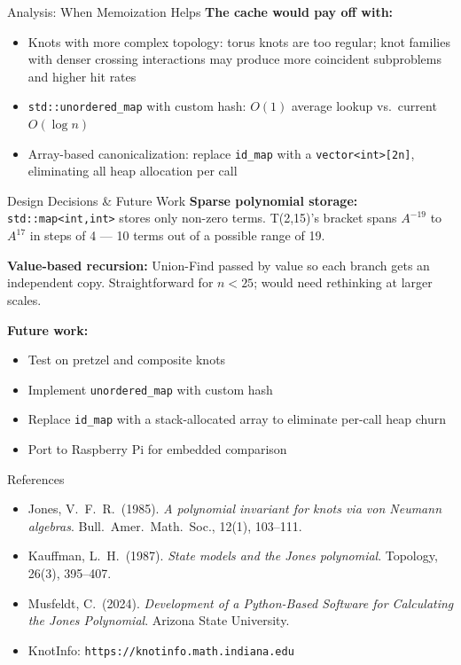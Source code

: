 \documentclass[final]{beamer}
\newlength{\colwidth}
\begin{document}
\begin{frame}[t,fragile]
\begin{columns}[t]
\begin{column}{\colwidth}
\begin{block}{Analysis: When Memoization Helps}
    \vspace{0.1cm}
    \textbf{The cache would pay off with:}
    \begin{itemize}\setlength\itemsep{0pt}
      \item Knots with more complex topology: torus knots are too regular; knot families with denser crossing interactions may produce more coincident subproblems and higher hit rates
      \item \texttt{std::unordered\_map} with custom hash: $O(1)$ average lookup vs.\ current $O(\log n)$
      \item Array-based canonicalization: replace \texttt{id\_map} with a \texttt{vector<int>[2n]}, eliminating all heap allocation per call
    \end{itemize}
  \end{block}

  \begin{block}{Design Decisions \& Future Work}
    \textbf{Sparse polynomial storage:} \texttt{std::map<int,int>} stores only non-zero terms. T(2,15)'s bracket spans $A^{-19}$ to $A^{17}$ in steps of 4 --- 10 terms out of a possible range of 19.

    \vspace{0.1cm}
    \textbf{Value-based recursion:} Union-Find passed by value so each branch gets an independent copy. Straightforward for $n < 25$; would need rethinking at larger scales.

    \vspace{0.1cm}
    \textbf{Future work:}
    \begin{itemize}\setlength\itemsep{0pt}
      \item Test on pretzel and composite knots
      \item Implement \texttt{unordered\_map} with custom hash
      \item Replace \texttt{id\_map} with a stack-allocated array to eliminate per-call heap churn
      \item Port to Raspberry Pi for embedded comparison
    \end{itemize}
  \end{block}

  \begin{block}{References}
    \footnotesize
    \begin{itemize}\setlength\itemsep{0pt}
      \item Jones, V.\ F.\ R.\ (1985). \textit{A polynomial invariant for knots via von Neumann algebras}. Bull.\ Amer.\ Math.\ Soc., 12(1), 103--111.
      \item Kauffman, L.\ H.\ (1987). \textit{State models and the Jones polynomial}. Topology, 26(3), 395--407.
      \item Musfeldt, C.\ (2024). \textit{Development of a Python-Based Software for Calculating the Jones Polynomial}. Arizona State University.
      \item KnotInfo: \texttt{https://knotinfo.math.indiana.edu}
    \end{itemize}
  \end{block}


\end{column}
\end{columns}
\end{frame}
\end{document}
